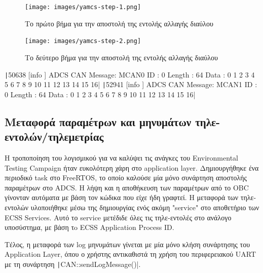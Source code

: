 \documentclass[a4paper,nobib,justified]{tufte-book}
\begin{document}
\begin{figure}
	\texttt{[image: images/yamcs-step-1.png]}
	\label{fig:yamcs-step-1}
	\caption{Το πρώτο βήμα για την αποστολή της εντολής αλλαγής διαύλου}
\end{figure}
\begin{figure}
	\texttt{[image: images/yamcs-step-2.png]}
	\label{fig:yamcs-step-2}
	\caption{Το δεύτερο βήμα για την αποστολή της εντολής αλλαγής διαύλου}
\end{figure}

\texttt|50638 [info     ] ADCS     CAN Message: MCAN0 ID : 0 Length : 64 Data : 0 1 2 3 4 5 6 7 8 9 10 11 12 13 14 15 16|
\texttt|52941 [info     ] ADCS     CAN Message: MCAN1 ID : 0 Length : 64 Data : 0 1 2 3 4 5 6 7 8 9 10 11 12 13 14 15 16|

\subsection{Μεταφορά παραμέτρων και μηνυμάτων τηλε-εντολών/τηλεμετρίας}
Η τροποποίηση του λογισμικού για να καλύψει τις ανάγκες του Environmental Testing Campaign ήταν ευκολότερη χάρη στο application layer. Δημιουργήθηκε ένα περιοδικό task στο FreeRTOS, το οποίο καλούσε μία μόνο συνάρτηση αποστολής παραμέτρων στο ADCS. Η λήψη και η αποθήκευση των παραμέτρων από το OBC γίνονταν αυτόματα με βάση τον κώδικα που είχε ήδη γραφτεί. Η μεταφορά των τηλε-εντολών υλοποιήθηκε μέσω της δημιουργίας ενός ακόμη "service" στο αποθετήριο των ECSS Services. Αυτό το service μετέδιδε όλες τις τηλε-εντολές στο ανάλογο υποσύστημα, με βάση τo ECSS Application Process ID.

Τέλος, η μεταφορά των log μηνυμάτων γίνεται με μία μόνο κλήση συνάρτησης του Application Layer, όπου ο χρήστης αντικαθιστά τη χρήση του περιφερειακού UART με τη συνάρτηση \texttt|CAN::sendLogMessage()|.
\end{document}
